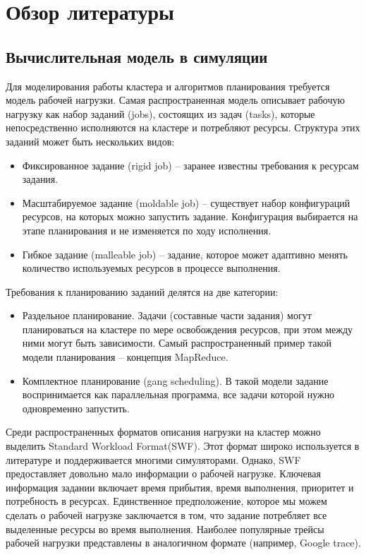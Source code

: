 \section{Обзор литературы}\label{sec:lit-review}


\subsection{Вычислительная модель в симуляции}

Для моделирования работы кластера и алгоритмов планирования требуется модель рабочей нагрузки. Самая распространенная модель описывает рабочую нагрузку как набор заданий (jobs), состоящих из задач (tasks), которые непосредственно исполняются на кластере и потребляют ресурсы. Структура этих заданий может быть нескольких видов: 
\begin{itemize}
  \item Фиксированное задание (rigid job) -- заранее известны требования к ресурсам задания.
  \item Масштабируемое задание (moldable job) -- существует набор конфигураций ресурсов, на которых можно запустить задание. Конфигурация выбирается на этапе планирования и не изменяется по ходу исполнения. 
  \item Гибкое задание (malleable job) -- задание, которое может адаптивно менять количество используемых ресурсов в процессе выполнения.
\end{itemize}

Требования к планированию заданий делятся на две категории:
\begin{itemize}
  \item Раздельное планирование. Задачи (составные части задания) могут планироваться на кластере по мере освобождения ресурсов, при этом между ними могут быть зависимости. Самый распространенный пример такой модели планирования -- концепция MapReduce\cite{mapreduce-article}.
  \item Комплектное планирование (gang scheduling). В такой модели задание воспринимается как параллельная программа, все задачи которой нужно одновременно запустить.
\end{itemize}

Среди распространенных форматов описания нагрузки на кластер можно выделить Standard Workload Format(SWF)\cite{standard-workload-format}. Этот формат широко используется в литературе и поддерживается многими симуляторами. Однако, SWF предоставляет довольно мало информации о рабочей нагрузке. Ключевая информация задании включает время прибытия, время выполнения, приоритет и потребность в ресурсах. Единственное предположение, которое мы можем сделать о рабочей нагрузке заключается в том, что задание потребляет все выделенные ресурсы во время выполнения. Наиболее популярные трейсы рабочей нагрузки представлены в аналогичном формате (например, Google trace\cite{google-clusterdata}).

